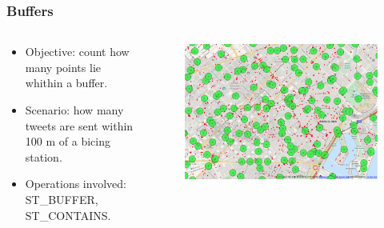 \documentclass[hyperref={pdfpagelabels=true}]{beamer}
\begin{document}
\begin{frame}
\frametitle{Buffers}
\begin{columns}
  \begin{column}{0.5\textwidth}
    \begin{itemize}    
      \item<1->Objective: count how many points lie whithin a buffer.
      \item<1->Scenario: how many tweets are sent within 100 m of a bicing station.%
      \item<1->Operations involved: ST\_BUFFER, ST\_CONTAINS.    
    \end{itemize} 
 \end{column}  
  \begin{column}{0.5\textwidth}    
    \begin{figure}       
	\includegraphics[width=\textwidth]{bicing.png}      
     \end{figure}            
 \end{column}  
\end{columns}           
\end{frame}
\end{document}
